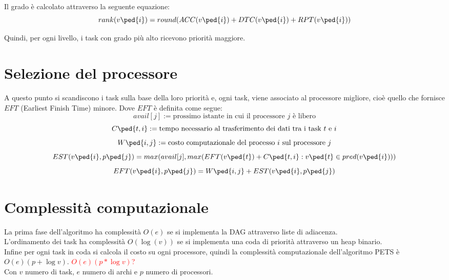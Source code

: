 Il grado è calcolato attraverso la seguente equazione:
\begin{equation}\label{Grado}
	rank(v\ped{i}) = round(ACC(v\ped{i}) + DTC(v\ped{i}) + RPT(v\ped{i}))
\end{equation}

Quindi, per ogni livello, i task con grado più alto ricevono priorità maggiore.



\section{Selezione del processore}
A questo punto si scandiscono i task sulla base della loro priorità e, ogni task, viene associato al processore migliore, cioè quello che fornisce $EFT$ (Earliest Finish Time) minore. 
Dove $EFT$ è definita come segue:
\begin{displaymath}
	avail[j] := \text{prossimo istante in cui il processore $j$ è libero}
\end{displaymath}
\begin{displaymath}
	C\ped{t,i} := \text{tempo necessario al trasferimento dei dati tra i task $t$ e $i$} 
\end{displaymath}
\begin{displaymath}
	W\ped{i,j} := \text{costo computazionale del processo $i$ sul processore $j$} 
\end{displaymath}
\begin{equation}\label{EST}
	EST(v\ped{i},p\ped{j}) = max(avail[j], max(EFT(v\ped{t}) + C\ped{t,i} : v\ped{t} \in pred(v\ped{i})))
\end{equation}
\begin{equation}\label{EFT}
	EFT(v\ped{i},p\ped{j}) = W\ped{i,j} + EST(v\ped{i},p\ped{j})
\end{equation}


\section{Complessità computazionale}
La prima fase dell'algoritmo ha complessità $O(e)$ se si implementa la DAG attraverso liste di adiacenza.
\\
L'ordinamento dei task ha complessità $O(\log(v))$ se si implementa una coda di priorità attraverso un heap binario.
\\
Infine per ogni task in coda si calcola il costo su ogni processore, quindi la complessità computazionale dell'algoritmo PETS è \( O(e)(p + \log{v}) \). \textcolor{red}{\( O(e)(p * \log{v}) \)?}
\\
Con $v$ numero di task, $e$ numero di archi e $p$ numero di processori.